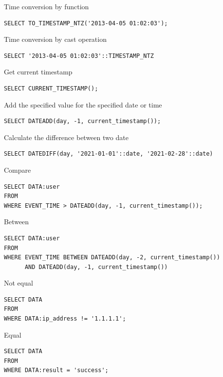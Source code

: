 \documentclass[9pt]{innovativeinnovation-cheatsheet}
\begin{document}
\begin{multicols}{3}
\small
Time conversion by function
\\[-18pt]
\begin{lstlisting}[style=code_style]
SELECT TO_TIMESTAMP_NTZ('2013-04-05 01:02:03');
\end{lstlisting}
\small
Time conversion by cast operation
\\[-18pt]
\begin{lstlisting}[style=code_style]
SELECT '2013-04-05 01:02:03'::TIMESTAMP_NTZ
\end{lstlisting}

Get current timestamp
\\[-18pt]
\begin{lstlisting}[style=code_style]
SELECT CURRENT_TIMESTAMP();
\end{lstlisting}
Add the specified value for the specified date or time
\\[-18pt]
\begin{lstlisting}[style=code_style]
SELECT DATEADD(day, -1, current_timestamp());
\end{lstlisting}
Calculate the difference between two date
\\[-18pt]
\begin{lstlisting}[style=code_style]
SELECT DATEDIFF(day, '2021-01-01'::date, '2021-02-28'::date)
\end{lstlisting}

Compare
\\[-18pt]
\begin{lstlisting}[style=code_style]
SELECT DATA:user
FROM
WHERE EVENT_TIME > DATEADD(day, -1, current_timestamp());
\end{lstlisting}
Between
\\[-18pt]
\begin{lstlisting}[style=code_style]
SELECT DATA:user
FROM
WHERE EVENT_TIME BETWEEN DATEADD(day, -2, current_timestamp())
      AND DATEADD(day, -1, current_timestamp())
\end{lstlisting}

Not equal
\\[-18pt]
\begin{lstlisting}[style=code_style]
SELECT DATA
FROM
WHERE DATA:ip_address != '1.1.1.1';
\end{lstlisting}

Equal
\\[-18pt]
\begin{lstlisting}[style=code_style]
SELECT DATA
FROM
WHERE DATA:result = 'success';
\end{lstlisting}


\end{multicols}
\end{document}
